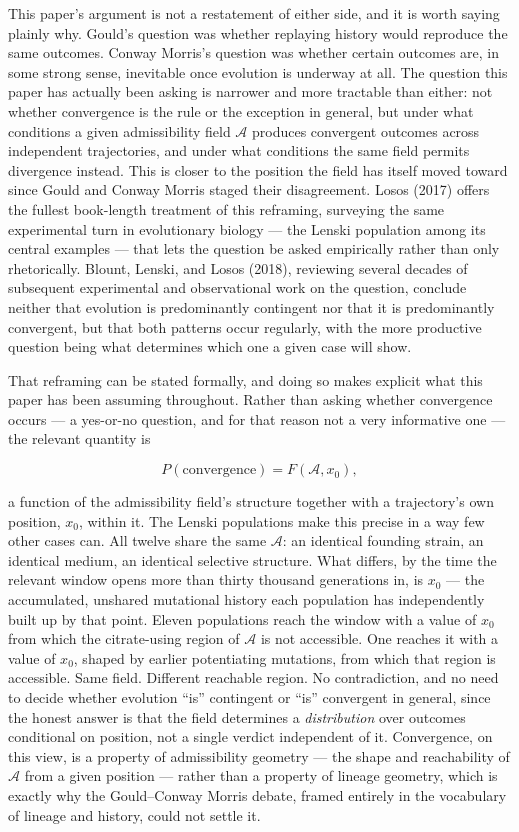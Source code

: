 \documentclass[11pt]{article}
\theoremstyle{plain}
\begin{document}
This paper's argument is not a restatement of either side, and it is worth saying plainly why. Gould's question was whether replaying history would reproduce the same outcomes. Conway Morris's question was whether certain outcomes are, in some strong sense, inevitable once evolution is underway at all. The question this paper has actually been asking is narrower and more tractable than either: not whether convergence is the rule or the exception in general, but under what conditions a given admissibility field \(\mathcal{A}\) produces convergent outcomes across independent trajectories, and under what conditions the same field permits divergence instead. This is closer to the position the field has itself moved toward since Gould and Conway Morris staged their disagreement. Losos (2017) offers the fullest book-length treatment of this reframing, surveying the same experimental turn in evolutionary biology --- the Lenski population among its central examples --- that lets the question be asked empirically rather than only rhetorically. Blount, Lenski, and Losos (2018), reviewing several decades of subsequent experimental and observational work on the question, conclude neither that evolution is predominantly contingent nor that it is predominantly convergent, but that both patterns occur regularly, with the more productive question being what determines which one a given case will show.

That reframing can be stated formally, and doing so makes explicit what this paper has been assuming throughout. Rather than asking whether convergence occurs --- a yes-or-no question, and for that reason not a very informative one --- the relevant quantity is

\[
P(\text{convergence}) = F(\mathcal{A}, x_0),
\]

a function of the admissibility field's structure together with a trajectory's own position, \(x_0\), within it. The Lenski populations make this precise in a way few other cases can. All twelve share the same \(\mathcal{A}\): an identical founding strain, an identical medium, an identical selective structure. What differs, by the time the relevant window opens more than thirty thousand generations in, is \(x_0\) --- the accumulated, unshared mutational history each population has independently built up by that point. Eleven populations reach the window with a value of \(x_0\) from which the citrate-using region of \(\mathcal{A}\) is not accessible. One reaches it with a value of \(x_0\), shaped by earlier potentiating mutations, from which that region is accessible. Same field. Different reachable region. No contradiction, and no need to decide whether evolution ``is'' contingent or ``is'' convergent in general, since the honest answer is that the field determines a \emph{distribution} over outcomes conditional on position, not a single verdict independent of it. Convergence, on this view, is a property of admissibility geometry --- the shape and reachability of \(\mathcal{A}\) from a given position --- rather than a property of lineage geometry, which is exactly why the Gould--Conway Morris debate, framed entirely in the vocabulary of lineage and history, could not settle it.
\end{document}
